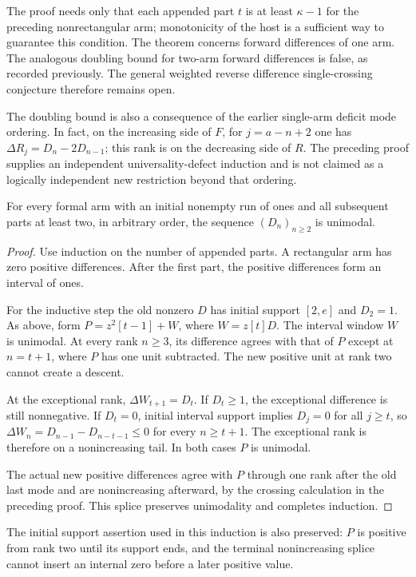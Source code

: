 The proof needs only that each appended part $t$ is at least
$\kappa-1$ for the preceding nonrectangular arm; monotonicity
of the host is a sufficient way to guarantee this condition.
The theorem concerns forward differences of one arm. The
analogous doubling bound for two-arm forward differences is
false, as recorded previously. The general weighted reverse
difference single-crossing conjecture therefore remains open.

The doubling bound is also a consequence of the earlier
single-arm deficit mode ordering. In fact, on the increasing
side of $F$, for $j=a-n+2$ one has
$\Delta R_j=D_n-2D_{n-1}$; this rank is on the decreasing
side of $R$. The preceding proof supplies an independent
universality-defect induction and is not claimed as a
logically independent new restriction beyond that ordering.

\begin{theorem}
For every formal arm with an initial nonempty run of ones
and all subsequent parts at least two, in arbitrary order,
the sequence $(D_n)_{n\ge2}$ is unimodal.
\end{theorem}
\begin{proof}
Use induction on the number of appended parts. A rectangular
arm has zero positive differences. After the first part, the
positive differences form an interval of ones.

For the inductive step the old nonzero $D$ has initial support
$[2,e]$ and $D_2=1$. As above, form
$P=z^2[t-1]+W$, where $W=z[t]D$. The interval window $W$
is unimodal. At every rank $n\ge3$, its difference agrees
with that of $P$ except at $n=t+1$, where $P$ has one unit
subtracted. The new positive unit at rank two cannot create
a descent.

At the exceptional rank,
$\Delta W_{t+1}=D_t$. If $D_t\ge1$, the exceptional
difference is still nonnegative. If $D_t=0$, initial interval
support implies $D_j=0$ for all $j\ge t$, so
$\Delta W_n=D_{n-1}-D_{n-t-1}\le0$ for every $n\ge t+1$.
The exceptional rank is therefore on a nonincreasing tail.
In both cases $P$ is unimodal.

The actual new positive differences agree with $P$ through
one rank after the old last mode and are nonincreasing
afterward, by the crossing calculation in the preceding proof.
This splice preserves unimodality and completes induction.
\end{proof}

The initial support assertion used in this induction is also
preserved: $P$ is positive from rank two until its support
ends, and the terminal nonincreasing splice cannot insert
an internal zero before a later positive value.
